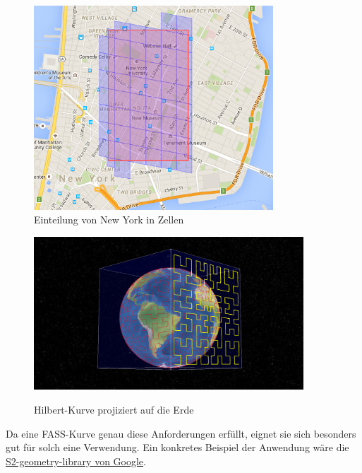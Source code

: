 \documentclass[course=erap]{aspdoc}
\begin{document}
\begin{figure}[h]
    \centering
    \begin{minipage}{0.45\textwidth}
        \centering
        \includegraphics[width=0.8\textwidth]{Map}\\
        \caption{Einteilung von New York in Zellen \cite{Kreiss2016}}
        \label{fig:Gmaps}
    \end{minipage}\hfill
    \begin{minipage}{0.45\textwidth}
        \centering
        \includegraphics[width=0.9\textwidth]{Earth} \\
        \caption{Hilbert-Kurve projiziert auf die Erde \cite{Kreiss2016}}
        \label{fig:hilbertCurveOnEarth}
    \end{minipage}
\end{figure}

Da eine FASS-Kurve genau diese Anforderungen erfüllt, eignet sie sich besonders gut für solch eine Verwendung. Ein konkretes Beispiel der Anwendung wäre die \href{https://code.google.com/archive/p/s2-geometry-library/}{S2-geometry-library von Google}. 
\end{document}
